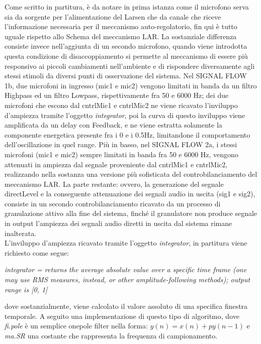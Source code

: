 Come scritto in partitura, è da notare in prima istanza
come il microfono serva sia da sorgente per l'alimentazione del Larsen che
da canale che riceve l'informazione necessaria per il meccanismo auto-regolatorio,
fin qui è tutto uguale rispetto allo Schema del meccanismo LAR.
La sostanziale differenza consiste invece nell'aggiunta di un secondo microfono,
quando viene introdotta questa condizione di disaccoppiamento si 
permette al meccanismo di essere più responsivo ai piccoli cambiamenti nell'ambiente
e di rispondere diversamente agli stessi stimoli da diversi punti di osservazione del sistema.
Nel SIGNAL FLOW 1b, due microfoni in ingresso (mic1 e mic2) 
vengono limitati in banda da un filtro Highpass ed 
un filtro Lowpass, rispettivamente fra 50 e 6000 Hz; dei due microfoni che escono 
dal cntrlMic1 e cntrlMic2 ne viene ricavato l'inviluppo d'ampiezza tramite
l'oggetto \textit{integrator}, poi la curva di questo inviluppo viene amplificata da 
un delay con Feedback, e ne viene estratta solamente la componente energetica 
presente fra i 0 e i 0.5Hz, limitandone il comportamento dell'oscillazione in quel range.
Più in basso, nel SIGNAL FLOW 2a, i stessi microfoni (mic1 e mic2) sempre
limitati in banda fra 50 e 6000 Hz, vengono attenuati in ampiezza dal segnale
proveniente dal cntrlMic1 e cntrlMic2, realizzando nella sostanza una 
versione più sofisticata del controbilanciamento del meccanismo LAR.
La parte restante: ovvero, la generazione del segnale directLevel e la 
conseguente attenuazione dei segnali audio in uscita (sig1 e sig2),
consiste in un secondo controbilanciamento ricavato da un processo di granulazione
attivo alla fine del sistema, finché il granulatore non produce segnale in output 
l'ampiezza dei segnali audio diretti in uscita dal sistema rimane inalterata. \\
L'inviluppo d'ampiezza ricavato tramite l'oggetto \textit{integrator}, in partitura 
viene richiesto come segue:

\begin{center}
    \vspace{0.5cm}
    \textit{integrator = returns the average absolute value over a specific 
    time frame (one may use RMS measures, instead, or other amplitude-following methods); 
    output range is [0, 1]}
    \vspace{0.5cm}
\end{center}

dove sostanzialmente, viene calcolato il valore assoluto di una specifica finestra temporale. 
A seguito una implementazione di questo tipo di algoritmo, dove \textit{fi.pole} è 
un semplice onepole filter nella forma: \(y(n) = x(n) + py(n-1)\) e \textit{ma.SR} 
una costante che rappresenta la frequenza di campionamento.

